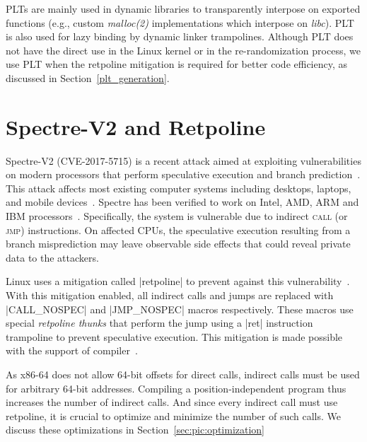 PLTs are mainly used in dynamic libraries to transparently interpose on exported functions (e.g., custom \textit{malloc(2)} implementations which interpose on \textit{libc}). PLT is also used for lazy binding by dynamic linker trampolines. Although PLT does not have the direct use in the Linux kernel or in the re-randomization process, we use PLT when the retpoline mitigation is required
for better code efficiency, as discussed in Section~\ref{plt_generation}.

\section{Spectre-V2 and Retpoline}
Spectre-V2 (CVE-2017-5715) is a recent attack aimed at exploiting vulnerabilities on modern processors that perform speculative execution and branch prediction~\cite{SPECTRE}. This attack affects most existing computer systems including desktops, laptops, and mobile devices~\cite{spectre_phone_computer:online}. Spectre has been verified to work on Intel, AMD, ARM and IBM processors~\cite{Meltdown53:online,spectre_ibm:online}.
Specifically, the system is vulnerable due to indirect \textsc{call} (or \textsc{jmp}) instructions. On affected CPUs, the speculative execution resulting from a branch misprediction may leave observable side effects that could reveal private data to the attackers.

Linux uses a mitigation called |retpoline| to prevent against this vulnerability~\cite{RETPOLINE}. With this mitigation enabled, all indirect calls and jumps are replaced with |CALL_NOSPEC| and |JMP_NOSPEC| macros respectively. These macros use special \textit{retpoline thunks} that perform the jump using a |ret| instruction trampoline to prevent speculative execution. This mitigation is made possible with the support of compiler~\cite{gcc_retpoline:online,llvm_retpoline:online}.

As x86-64 does not allow 64-bit offsets for direct calls, indirect calls must be used for arbitrary 64-bit addresses. Compiling a position-independent program thus increases the number of indirect calls. And since every indirect call must use retpoline, it is crucial to optimize and minimize the number of such calls. We discuss these optimizations in Section~\ref{sec:pic:optimization}
